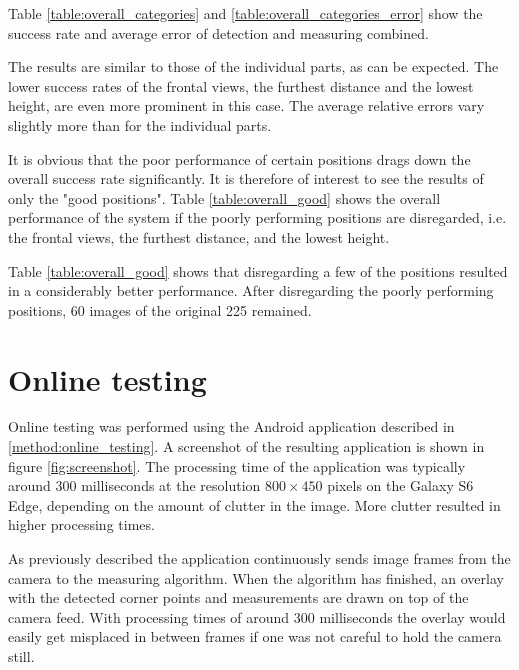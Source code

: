 Table \ref{table:overall_categories} and \ref{table:overall_categories_error} show the success rate and average error of detection and measuring combined.





The results are similar to those of the individual parts, as can be expected.
The lower success rates of the frontal views, the furthest distance and the lowest height, are even more prominent in this case.
The average relative errors vary slightly more than for the individual parts.

It is obvious that the poor performance of certain positions drags down the overall success rate significantly.
It is therefore of interest to see the results of only the "good positions".
Table \ref{table:overall_good} shows the overall performance of the system if the poorly performing positions are disregarded, i.e. the frontal views, the furthest distance, and the lowest height.



Table \ref{table:overall_good} shows that disregarding a few of the positions resulted in a considerably better performance.
After disregarding the poorly performing positions, 60 images of the original 225 remained.

\section{Online testing} \label{results:online}

Online testing was performed using the Android application described in \ref{method:online_testing}.
A screenshot of the resulting application is shown in figure \ref{fig:screenshot}. %
The processing time of the application was typically around 300 milliseconds at the resolution $800 \times 450$ pixels on the Galaxy S6 Edge, depending on the amount of clutter in the image. 
More clutter resulted in higher processing times.

As previously described the application continuously sends image frames from the camera to the measuring algorithm. 
When the algorithm has finished, an overlay with the detected corner points and measurements are drawn on top of the camera feed.
With processing times of around 300 milliseconds the overlay would easily get misplaced in between frames if one was not careful to hold the camera still. 

